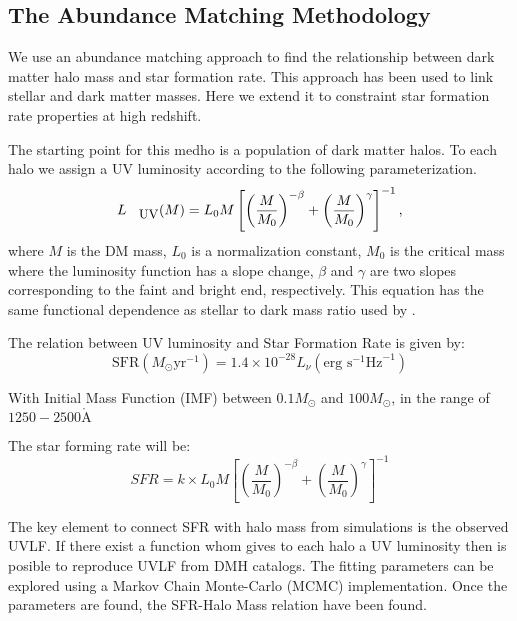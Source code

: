 \documentclass{emulateapj}
\begin{document}
\subsection{The Abundance Matching Methodology}
We use an abundance matching approach to find the relationship between
dark matter halo mass and star formation rate. 
This approach has been used to link stellar and dark matter masses. 
Here we extend it to constraint star formation rate properties at high
redshift. 

The starting point for this medho is a population of dark matter halos.
To each halo we assign a UV luminosity according to the following
parameterization.
  \begin{equation}\label{eqn:luminosity}
  L_{\textrm{\small{UV}}} (M) = L_{0} M \left[ \left( \frac{M}{M_0}\right)^{-\beta} 
		   + \left( \frac{M}{M_0}\right)^{\gamma} 
               \right]^{-1},
  \end{equation}
where $M$ is the DM mass, $L_{0}$ is a normalization constant, $M_0$
is the critical mass where the luminosity function has a slope change, 
$\beta$ and $\gamma$ are two slopes corresponding to the faint and
bright end, respectively. 
This equation has the same functional dependence as stellar to dark
mass ratio used by \citet{Moster10}.




The relation between UV luminosity and Star Formation Rate
\citep{Madau98,Kennicutt98} 
is given by:
\begin{equation}
 \textrm{SFR}\left(M_\odot \textrm{yr}^{-1}\right) 
      = 1.4 \times 10^{-28} L_{\nu} \left( \textrm{erg s}^{-1}\textrm{Hz}^{-1} 
	\right)
\end{equation}


  With Initial Mass Function (IMF) between $0.1 M_\odot$ 
 and $100 M_\odot$, in the range of $1250-2500 \mathring{\textrm{A}} $

The star forming rate will be:
  \begin{equation}
  SFR = k \times L_{0} M \left[ \left( \frac{M}{M_0}\right)^{-\beta} 
		   + \left( \frac{M}{M_0}\right)^{\gamma} 
               \right]^{-1}
  \end{equation}

The key element to connect SFR with halo mass from simulations is the observed 
UVLF. If there exist a function whom gives to each halo a UV luminosity then is 
posible to reproduce UVLF from DMH catalogs. The fitting parameters can be 
explored using a Markov Chain Monte-Carlo (MCMC) implementation. Once the 
parameters are found, the SFR-Halo Mass relation have been found.
\end{document}
